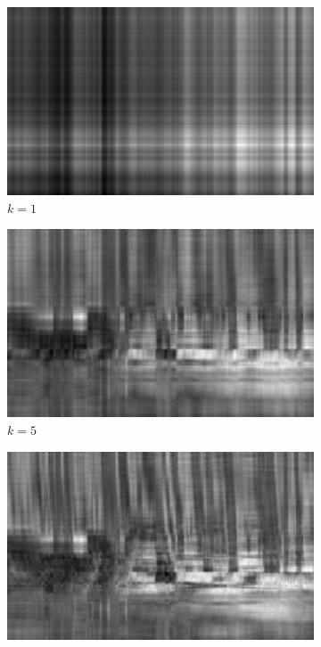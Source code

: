 \documentclass[11pt,a4paper]{article}
\begin{document}
\begin{figure}[H]
  \centering
  \begin{subfigure}[t]{.5\textwidth}
    \centering
    \includegraphics[scale=0.2]{img/k1_deer}
    \caption{$k = 1$}
  \end{subfigure}%
  \begin{subfigure}[t]{.5\textwidth}
    \centering
    \includegraphics[scale=0.2]{img/k5_deer}
    \caption{$k = 5$}
  \end{subfigure}
  \begin{subfigure}[t]{.5\textwidth}
    \centering
    \includegraphics[scale=0.2]{img/k10_deer}

\end{subfigure}
\end{figure}
\end{document}
